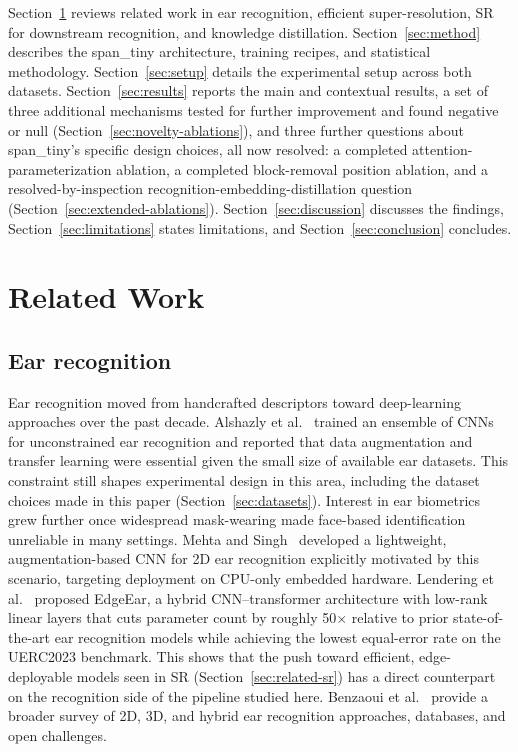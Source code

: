 \documentclass[11pt]{article}
\begin{document}
Section~\ref{sec:related} reviews related work in ear recognition, efficient super-resolution, SR for downstream recognition, and knowledge distillation. Section~\ref{sec:method} describes the span\_tiny architecture, training recipes, and statistical methodology. Section~\ref{sec:setup} details the experimental setup across both datasets. Section~\ref{sec:results} reports the main and contextual results, a set of three additional mechanisms tested for further improvement and found negative or null (Section~\ref{sec:novelty-ablations}), and three further questions about span\_tiny's specific design choices, all now resolved: a completed attention-parameterization ablation, a completed block-removal position ablation, and a resolved-by-inspection recognition-embedding-distillation question (Section~\ref{sec:extended-ablations}). Section~\ref{sec:discussion} discusses the findings, Section~\ref{sec:limitations} states limitations, and Section~\ref{sec:conclusion} concludes.

\section{Related Work}
\label{sec:related}

\subsection{Ear recognition}

Ear recognition moved from handcrafted descriptors toward deep-learning approaches over the past decade. Alshazly et al.~\cite{alshazly2020unconstrained} trained an ensemble of CNNs for unconstrained ear recognition and reported that data augmentation and transfer learning were essential given the small size of available ear datasets. This constraint still shapes experimental design in this area, including the dataset choices made in this paper (Section~\ref{sec:datasets}). Interest in ear biometrics grew further once widespread mask-wearing made face-based identification unreliable in many settings. Mehta and Singh~\cite{mehta2023ear} developed a lightweight, augmentation-based CNN for 2D ear recognition explicitly motivated by this scenario, targeting deployment on CPU-only embedded hardware. Lendering et al.~\cite{lendering2025edgeear} proposed EdgeEar, a hybrid CNN--transformer architecture with low-rank linear layers that cuts parameter count by roughly 50$\times$ relative to prior state-of-the-art ear recognition models while achieving the lowest equal-error rate on the UERC2023 benchmark. This shows that the push toward efficient, edge-deployable models seen in SR (Section~\ref{sec:related-sr}) has a direct counterpart on the recognition side of the pipeline studied here. Benzaoui et al.~\cite{benzaoui2023survey} provide a broader survey of 2D, 3D, and hybrid ear recognition approaches, databases, and open challenges.
\end{document}
